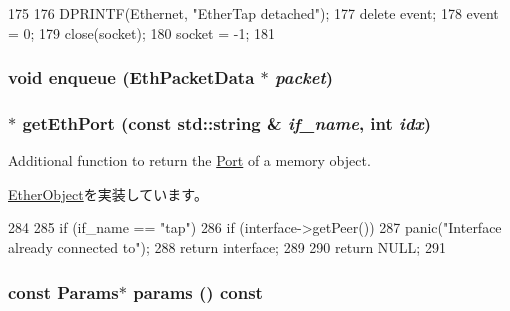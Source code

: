 \begin{DoxyCode}
175 {
176     DPRINTF(Ethernet, "EtherTap detached\n");
177     delete event;
178     event = 0;
179     close(socket);
180     socket = -1;
181 }
\end{DoxyCode}
\hypertarget{classEtherTap_a8d24b6b1d120220c6238bcdd262b3533}{
\subsubsection[{enqueue}]{\setlength{\rightskip}{0pt plus 5cm}void enqueue ({\bf EthPacketData} $\ast$ {\em packet})}}
\label{classEtherTap_a8d24b6b1d120220c6238bcdd262b3533}
\hypertarget{classEtherTap_a10260c5a583c0894dcdcd1ced50a53ae}{
\subsubsection[{getEthPort}]{ $\ast$ getEthPort (const std::string \& {\em if\_\-name}, \/  int {\em idx})}}
\label{classEtherTap_a10260c5a583c0894dcdcd1ced50a53ae}
Additional function to return the \hyperlink{classPort}{Port} of a memory object. 

\hyperlink{classEtherObject_ac1aa24c1f8c0f1ee8bdc3f3d3799f67c}{EtherObject}を実装しています。


\begin{DoxyCode}
284 {
285     if (if_name == "tap") {
286         if (interface->getPeer())
287             panic("Interface already connected to\n");
288         return interface;
289     }
290     return NULL;
291 }
\end{DoxyCode}
\hypertarget{classEtherTap_acd3c3feb78ae7a8f88fe0f110a718dff}{
\subsubsection[{params}]{\setlength{\rightskip}{0pt plus 5cm}const {\bf Params}$\ast$ params () const}}
\label{classEtherTap_acd3c3feb78ae7a8f88fe0f110a718dff}


